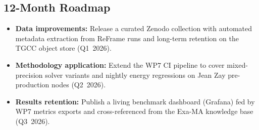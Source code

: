 \subsection{12-Month Roadmap}
\label{sec:WP7:Arcane Framework:roadmap}

\begin{itemize}
    \item \textbf{Data improvements:} Release a curated Zenodo collection with automated metadata extraction from ReFrame runs and long-term retention on the TGCC object store (Q1~2026).
    \item \textbf{Methodology application:} Extend the WP7 CI pipeline to cover mixed-precision solver variants and nightly energy regressions on Jean Zay pre-production nodes (Q2~2026).
    \item \textbf{Results retention:} Publish a living benchmark dashboard (Grafana) fed by WP7 metrics exports and cross-referenced from the Exa-MA knowledge base (Q3~2026).
\end{itemize}